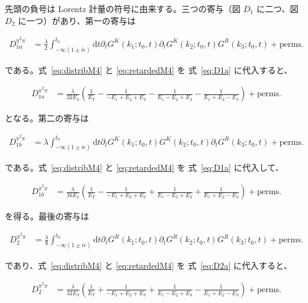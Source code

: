 \documentclass[a4paper,11pt]{ltjsarticle}
\numberwithin{equation}{section}
\newcommand{\dd}{\mathrm{d}}
\newcommand{\Eq}[1]{Eq.~(\ref{#1})}
\newcommand{\Eqs}[1]{Eqs.~(\ref{#1})}
\renewcommand{\Eq}[1]{式~\eqref{#1}}
\renewcommand{\Eqs}[1]{式~\eqref{#1}}
\begin{document}
先頭の負号は Lorentz 計量の符号に由来する。三つの寄与（図 $D_1$ に二つ、図 $D_2$ に一つ）があり、第一の寄与は

\begin{align}\label{eq:D1a}
D^{\dot{\pi}^2 \pi}_{1a} &= \frac{\lambda}{2} \int_{-\infty(1\pm i \epsilon)}^{t_0} \dd t \partial_t G^K(k_1; t_0,t) \partial_t G^K(k_2; t_0,t)G^R(k_3; t_0,t) + \mathrm{perms}. 
\end{align}

である。\Eqs{eq:distribM4} と \eqref{eq:retardedM4} を \Eq{eq:D1a} に代入すると、

\begin{align}\label{eq:D1aresult}
D^{\dot{\pi}^2 \pi}_{1a} &=   \frac{\lambda}{32E_3} \left( \frac{1}{E_T} - \frac{1}{-E_1 + E_2 + E_3} - \frac{1}{E_1 - E_2 + E_3} - \frac{1}{E_1 + E_2 - E_3}\right)+ \mathrm{perms}. 
\end{align}

となる。第二の寄与は

\begin{align}\label{eq:D1b}
D^{\dot{\pi}^2 \pi}_{1b} &= \lambda \int_{-\infty(1\pm i \epsilon)}^{t_0} \dd t \partial_t G^K(k_1; t_0,t)  G^K(k_2; t_0,t)\partial_t G^R(k_3; t_0,t) + \mathrm{perms}. 
\end{align}

である。\Eqs{eq:distribM4} と \eqref{eq:retardedM4} を \Eq{eq:D1a} に代入して、

\begin{align}\label{eq:D1bresult}
D^{\dot{\pi}^2 \pi}_{1b} &=  \frac{\lambda}{16E_2} \left( \frac{1}{E_T} - \frac{1}{-E_1 + E_2 + E_3} + \frac{1}{E_1 - E_2 + E_3} + \frac{1}{E_1 + E_2 - E_3}\right)+ \mathrm{perms}.
\end{align}

を得る。最後の寄与は

\begin{align}\label{eq:D2a}
D^{\dot{\pi}^2 \pi}_{2} &= \frac{\lambda}{8} \int_{-\infty(1\pm i \epsilon)}^{t_0} \dd t \partial_t G^R(k_1; t_0,t) \partial_t G^R(k_2; t_0,t)G^R(k_3; t_0,t) + \mathrm{perms}. 
\end{align}

であり、\Eqs{eq:distribM4} と \eqref{eq:retardedM4} を \Eq{eq:D2a} に代入すると、

\begin{align}\label{eq:D2aresult}
D^{\dot{\pi}^2 \pi}_{2} &=   \frac{\lambda}{32E_3} \left( \frac{1}{E_T} + \frac{1}{-E_1 + E_2 + E_3} + \frac{1}{E_1 - E_2 + E_3} - \frac{1}{E_1 + E_2 - E_3}\right)+ \mathrm{perms}.
\end{align}
\end{document}
